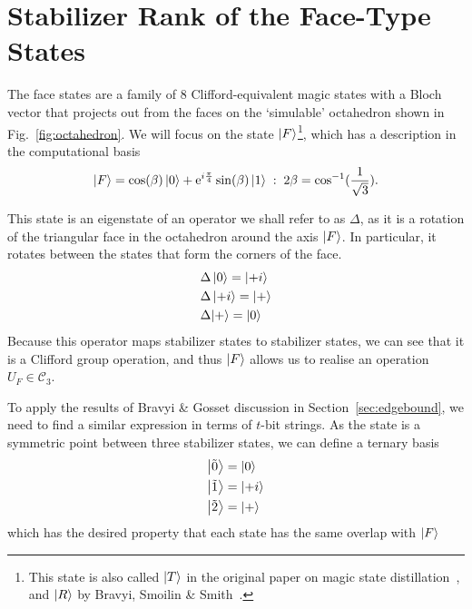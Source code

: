 \documentclass{standalone}
\begin{document}
\section{Stabilizer Rank of the Face-Type States}\label{sec:frank}
The face states are a family of $8$ Clifford-equivalent magic states with a Bloch vector that projects out from the faces on the `simulable' octahedron shown in Fig.~\ref{fig:octahedron}. We will focus on the state $\ket{F}$\footnote{This state is also called $\ket{T}$ in the original paper on magic state distillation~\cite{Bravyi2005}, and $\ket{R}$ by Bravyi, Smoilin \& Smith~\cite{Bravyi2015}.}, which has a description in the computational basis~\cite{Bravyi2005}
\begin{equation}\label{eq:Fstate}
\ket{F} = \cos(\beta)\ket{0}+\mathrm{e}^{i\frac{\pi}{4}}\sin(\beta)\ket{1}\;:\;2\beta = \cos^{-1}(\frac{1}{\sqrt{3}}).
\end{equation}
\par
This state is an eigenstate of an operator we shall refer to as $\Delta$, as it is a rotation of the triangular face in the octahedron around the axis $\ket{F}$. In particular, it rotates between the states that form the corners of the face.
\begin{align}
\begin{split}
    &\Delta\ket{0} = \ket{+i}\\
    &\Delta\ket{+i} = \ket{+} \\
    &\Delta{\ket{+}} = \ket{0} \\
\end{split}
\end{align}
Because this operator maps stabilizer states to stabilizer states, we can see that it is a Clifford group operation, and thus $\ket{F}$ allows us to realise an operation $U_{F}\in\mathcal{C}_{3}$.
\par
To apply the results of Bravyi \& Gosset discussion in Section~\ref{sec:edgebound}, we need to find a similar expression in terms of $t$-bit strings. As the state is a symmetric point between three stabilizer states, we can define a ternary basis
\begin{align}
\begin{split}
\ket{\tilde{0}} &= \ket{0}\\
\ket{\tilde{1}} &= \ket{+i}\\
\ket{\tilde{2}} &= \ket{+}\\
\end{split}
\end{align}
which has the desired property that each state has the same overlap with $\ket{F}$
\end{document}

